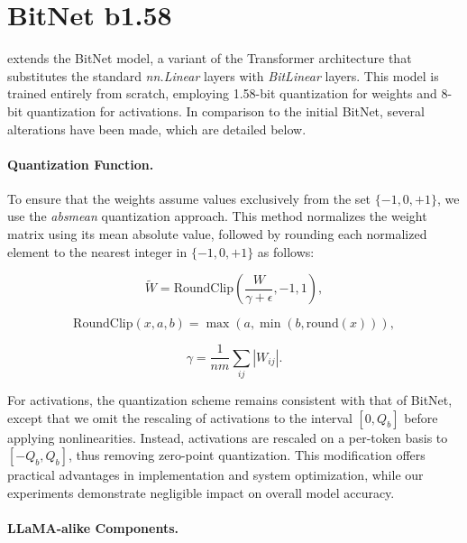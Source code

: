 \section{BitNet b1.58}

 extends the BitNet model, a variant of the Transformer architecture that substitutes the standard \emph{nn.Linear} layers with \emph{BitLinear} layers. This model is trained entirely from scratch, employing 1.58-bit quantization for weights and 8-bit quantization for activations. In comparison to the initial BitNet, several alterations have been made, which are detailed below.

\paragraph{Quantization Function.} To ensure that the weights assume values exclusively from the set $\{-1, 0, +1\}$, we use the \emph{absmean} quantization approach. This method normalizes the weight matrix using its mean absolute value, followed by rounding each normalized element to the nearest integer in $\{-1, 0, +1\}$ as follows:

\begin{equation}
    \widetilde{W} = \mathrm{RoundClip}\left(\frac{W}{\gamma + \epsilon}, -1, 1\right),
\end{equation}

\begin{equation}
    \mathrm{RoundClip}(x, a, b) = \max(a, \min(b, \mathrm{round}(x))),
\end{equation}

\begin{equation}
    \gamma = \frac{1}{nm}\sum_{ij} |W_{ij}|.
\end{equation}

For activations, the quantization scheme remains consistent with that of BitNet, except that we omit the rescaling of activations to the interval $[0, Q_b]$ before applying nonlinearities. Instead, activations are rescaled on a per-token basis to $[-Q_b, Q_b]$, thus removing zero-point quantization. This modification offers practical advantages in implementation and system optimization, while our experiments demonstrate negligible impact on overall model accuracy.

\paragraph{LLaMA-alike Components.}

